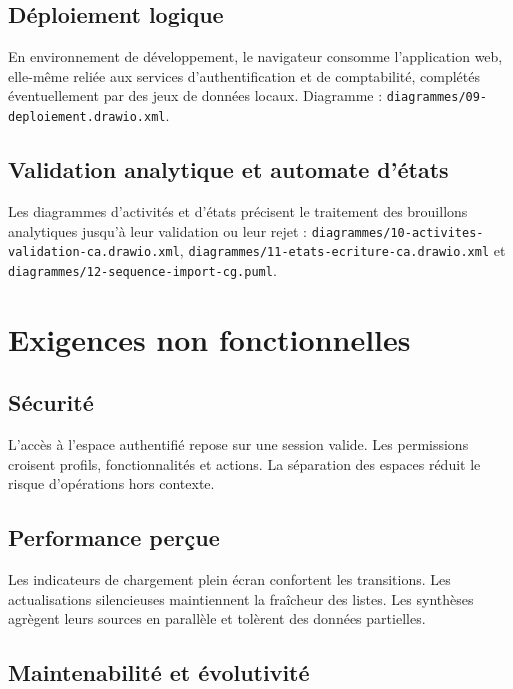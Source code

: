 \documentclass[12pt,a4paper]{report}
\begin{document}
\section{Déploiement logique}

En environnement de développement, le navigateur consomme l'application web, elle-même reliée aux services d'authentification et de comptabilité, complétés éventuelle\-ment par des jeux de données locaux. Diagramme : \texttt{diagrammes/09-deploiement.drawio.xml}.

\section{Validation analytique et automate d'états}

Les diagrammes d'activités et d'états précisent le traitement des brouillons analytiques jusqu'à leur validation ou leur rejet : \texttt{diagrammes/10-activites-validation-ca.drawio.xml}, \texttt{diagrammes/11-etats-ecriture-ca.drawio.xml} et \texttt{diagrammes/12-sequence-import-cg.puml}.

\chapter{Exigences non fonctionnelles}

\section{Sécurité}

L'accès à l'espace authentifié repose sur une session valide. Les permissions croisent profils, fonctionnalités et actions. La séparation des espaces réduit le risque d'opérations hors contexte.

\section{Performance perçue}

Les indicateurs de chargement plein écran confortent les transitions. Les actualisations silencieuses maintiennent la fraîcheur des listes. Les synthèses agrègent leurs sources en parallèle et tolèrent des données partielles.

\section{Maintenabilité et évolutivité}
\end{document}
